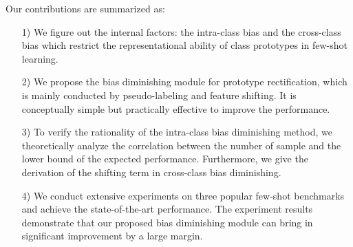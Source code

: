 \documentclass[runningheads]{llncs}
\begin{document}
Our contributions are summarized as:
\begin{itemize}
    \item[1)] We figure out the internal factors: the intra-class bias and the cross-class bias which restrict the representational ability of class prototypes in few-shot learning.
    \item[2)] We propose the bias diminishing module for prototype rectification, which is mainly conducted by pseudo-labeling and feature shifting. It is conceptually simple but practically effective to improve the performance.
    \item[3)] To verify the rationality of the intra-class bias diminishing method, we theoretically analyze the correlation between the number of sample and the lower bound of the expected performance. Furthermore, we give the derivation of the shifting term in cross-class bias diminishing.
    \item[4)] We conduct extensive experiments on three popular few-shot benchmarks and achieve the state-of-the-art performance. The experiment results demonstrate that our proposed bias diminishing module can bring in significant improvement by a large margin.
\end{itemize}
\end{document}

